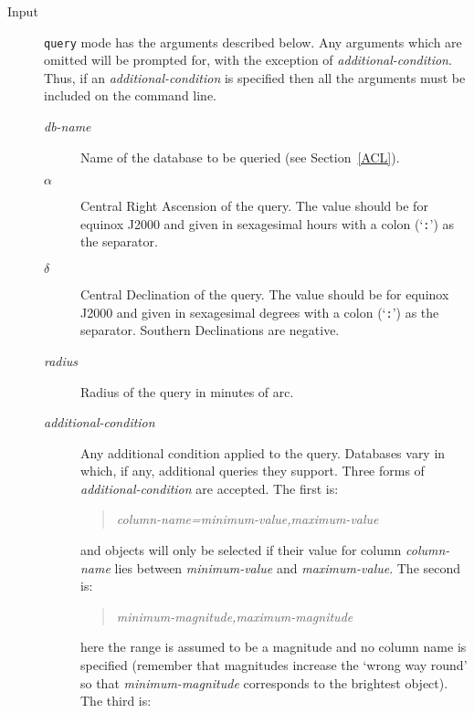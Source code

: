 \documentclass[twoside,11pt]{article}
\renewcommand{\_}{\texttt{\symbol{95}}}
\begin{document}
\begin{description}

  \item[Input] {\tt query} mode has the arguments described below.  Any
   arguments which are omitted will be prompted for, with the exception of
   {\it additional-condition}.  Thus, if an {\it additional-condition}\/
   is specified then all the arguments must be included on the command line.

  \begin{description}

    \item[{\it db-name}\/] Name of the database to be queried (see
     Section~\ref{ACL}).

    \item[$\alpha$\/] Central Right Ascension of the query.  The value
     should be for equinox J2000 and given in sexagesimal hours with
     a colon (`{\tt :}') as the separator.

    \item[$\delta$\/] Central Declination of the query.  The value
     should be for equinox J2000 and given in sexagesimal degrees with
     a colon (`{\tt :}') as the separator.  Southern Declinations are
     negative.

    \item[{\it radius}\/] Radius of the query in minutes of arc.

    \item[{\it additional-condition}\/] Any additional condition applied
     to the query.  Databases vary in which, if any, additional queries
     they support.  Three forms of {\it additional-condition}\/ are
     accepted.  The first is:

    \begin{quote}
     {\it column-name=minimum-value,maximum-value}
    \end{quote}

     and objects will only be selected if their value for column {\it
     column-name}\/ lies between {\it minimum-value}\/ and {\it
     maximum-value}.  The second is:

    \begin{quote}
     {\it minimum-magnitude,maximum-magnitude}
    \end{quote}

     here the range is assumed to be a magnitude and no column name is
     specified (remember that magnitudes increase the `wrong way round'
     so that {\it minimum-magnitude}\/ corresponds to the brightest
     object).  The third is:


\end{description}
\end{description}
\end{document}
